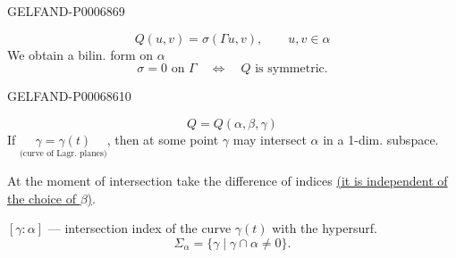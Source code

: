 \begin{GelfandAdjacentEvidence}{GELFAND-P000686}{9}

\[
Q(u,v)=\sigma(\Gamma u,v),\qquad u,v\in\alpha
\]
We obtain a bilin. form on \(\alpha\)
\[
\sigma=0\text{ on }\Gamma\quad\Leftrightarrow\quad Q\text{ is symmetric.}
\]
\end{GelfandAdjacentEvidence}
\begin{GelfandAdjacentEvidence}{GELFAND-P000686}{10}

\[
Q=Q(\alpha,\beta,\gamma)
\]
If \(\underset{\text{(curve of Lagr. planes)}}{\gamma=\gamma(t)}\), then at some point \(\gamma\) may intersect \(\alpha\)
in a 1-dim. subspace.

At the moment of intersection take the difference of indices \underline{(it is independent of the choice of \(\beta\))}.

\([\gamma:\alpha]\) --- intersection index of the curve \(\gamma(t)\) with the hypersurf.
\[
\Sigma_\alpha=\{\gamma\mid\gamma\cap\alpha\ne0\}.
\]
\end{GelfandAdjacentEvidence}



